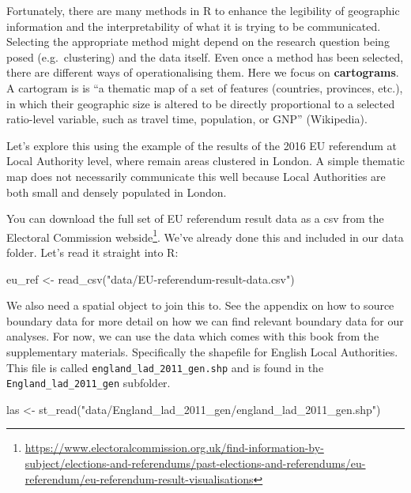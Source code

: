 \documentclass[
  krantz2]{krantz}
\makeatletter
\newenvironment{Shaded}{\begin{snugshade}}{\end{snugshade}}
\newcommand{\FunctionTok}[1]{\textcolor[rgb]{0,0,0}{#1}}
\newcommand{\NormalTok}[1]{#1}
\newcommand{\OtherTok}[1]{\textcolor[rgb]{0.37,0.37,0.37}{#1}}
\newcommand{\StringTok}[1]{\textcolor[rgb]{0.5,0.5,0.5}{#1}}
\renewcommand{\href}[2]{#2\footnote{\url{#1}}}
\newenvironment{kframe}{%
\medskip{}
\setlength{\fboxsep}{.8em}
 \def\at@end@of@kframe{}%
 \ifinner\ifhmode%
  \def\at@end@of@kframe{\end{minipage}}%
  \begin{minipage}{\columnwidth}%
 \fi\fi%
 \def\FrameCommand##1{\hskip\@totalleftmargin \hskip-\fboxsep
 \colorbox{shadecolor}{##1}\hskip-\fboxsep
     \hskip-\linewidth \hskip-\@totalleftmargin \hskip\columnwidth}%
 \MakeFramed {\advance\hsize-\width
   \@totalleftmargin\z@ \linewidth\hsize
   \@setminipage}}%
 {\par\unskip\endMakeFramed%
 \at@end@of@kframe}
\renewenvironment{Shaded}{\begin{kframe}}{\end{kframe}}
\makeatother
\begin{document}
Fortunately, there are many methods in R to enhance the legibility of geographic information and the interpretability of what it is trying to be communicated. Selecting the appropriate method might depend on the research question being posed (e.g.~clustering) and the data itself. Even once a method has been selected, there are different ways of operationalising them. Here we focus on \textbf{cartograms}. A cartogram is is ``a thematic map of a set of features (countries, provinces, etc.), in which their geographic size is altered to be directly proportional to a selected ratio-level variable, such as travel time, population, or GNP'' (Wikipedia).

Let's explore this using the example of the results of the 2016 EU referendum at Local Authority level, where remain areas clustered in London. A simple thematic map does not necessarily communicate this well because Local Authorities are both small and densely populated in London.

You can download the full set of EU referendum result data as a csv from \href{https://www.electoralcommission.org.uk/find-information-by-subject/elections-and-referendums/past-elections-and-referendums/eu-referendum/eu-referendum-result-visualisations}{the Electoral Commission webside}. We've already done this and included in our data folder. Let's read it straight into R:

\begin{Shaded}
\begin{Highlighting}[]
\NormalTok{eu\_ref }\OtherTok{\textless{}{-}} \FunctionTok{read\_csv}\NormalTok{(}\StringTok{"data/EU{-}referendum{-}result{-}data.csv"}\NormalTok{)}
\end{Highlighting}
\end{Shaded}

We also need a spatial object to join this to. See the appendix on how to source boundary data for more detail on how we can find relevant boundary data for our analyses. For now, we can use the data which comes with this book from the supplementary materials. Specifically the shapefile for English Local Authorities. This file is called \texttt{england\_lad\_2011\_gen.shp} and is found in the \texttt{England\_lad\_2011\_gen} subfolder.

\begin{Shaded}
\begin{Highlighting}[]
\NormalTok{las }\OtherTok{\textless{}{-}} \FunctionTok{st\_read}\NormalTok{(}\StringTok{"data/England\_lad\_2011\_gen/england\_lad\_2011\_gen.shp"}\NormalTok{)}
\end{Highlighting}
\end{Shaded}
\end{document}
